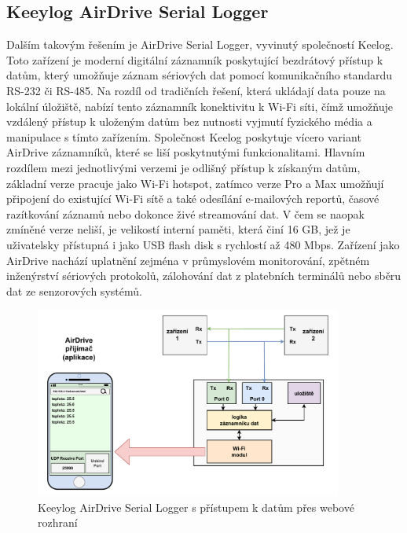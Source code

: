\subsection{Keeylog AirDrive Serial Logger}
\label{keelog_airdrive_serial_datalogger}
Dalším takovým řešením je AirDrive Serial Logger, vyvinutý společností Keelog. Toto zařízení je moderní digitální záznamník poskytující bezdrátový přístup k datům, který umožňuje záznam sériových dat pomocí komunikačního standardu RS-232 či RS-485. Na rozdíl od tradičních řešení, která ukládají data pouze na lokální úložiště, nabízí tento záznamník konektivitu k Wi-Fi síti, čímž umožňuje vzdálený přístup k uloženým datům bez nutnosti vyjmutí fyzického média a manipulace s tímto zařízením. Společnost Keelog poskytuje vícero variant AirDrive záznamníků, které se liší poskytnutými funkcionalitami. Hlavním rozdílem mezi jednotlivými verzemi je odlišný přístup k získaným datům, základní verze pracuje jako Wi-Fi hotspot, zatímco verze Pro a Max umožňují připojení do existující Wi-Fi sítě a také odesílání e-mailových reportů, časové razítkování záznamů nebo dokonce živé streamování dat. V čem se naopak zmíněné verze neliší, je velikostí interní paměti, která činí 16 GB, jež je uživatelsky přístupná i jako USB flash disk s rychlostí až 480 Mbps. Zařízení jako AirDrive nachází uplatnění zejména v průmyslovém monitorování, zpětném inženýrství sériových protokolů, zálohování dat z platebních terminálů nebo sběru dat ze senzorových systémů. \cite{keelog_airdrive_serial_datalogger, keelog_airdrive_serial_datalogger_max, keelog_airdrive_serial_datalogger_pro}

\begin{figure}[h]
    \centering
    \includegraphics[width=0.90\textwidth]{obrazky-figures/keeylog_airdrive_serial_logger-cz.pdf}
    
    \caption{Keeylog AirDrive Serial Logger s přístupem k datům přes webové rozhraní \cite{keelog_airdrive_serial_datalogger, keelog_airdrive_serial_datalogger_scheme}}
    \label{fig:keelog-airdrive-serial-datalogger}
\end{figure}

